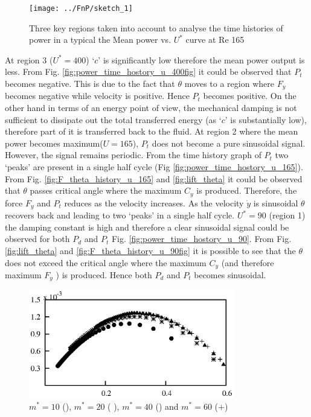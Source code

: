\begin{figure}[h!]
\centering
\texttt{[image: ../FnP/sketch\_1]}
\caption{ Three key regions taken into account to analyse the time histories of power in a typical the Mean power vs. $U^*$ curve at Re 165 }
\label{fig:regions_1}
\end{figure}









At region 3 ($U^*= 400$) `$c$' is significantly low therefore the mean power output is less. From Fig. \ref{fig:power_time_hostory_u_400fig} it could be observed that $P_t$ becomes negative. This is due to the fact that $\theta$ moves to a region where $F_y$ becomes negative while velocity is positive. Hence $P_t$ becomes positive. On the other hand in terms of an energy point  of view, the mechanical damping is not sufficient to dissipate out the total transferred energy (as `$c$' is substantially low), therefore  part of it  is transferred back to the fluid. At region 2 where the  mean power becomes maximum($U=165$), $P_t$ does not become a pure sinusoidal signal. However, the  signal remains periodic. From the time history graph of $P_t$ two `peaks' are present in a single half cycle (Fig \ref{fig:power_time_hostory_u_165}). From  Fig. \ref{fig:F_theta_history_u_165} and \ref{fig:lift_theta} it could be observed that $\theta$ passes critical angle where the maximum $C_y$ is produced. Therefore, the force $F_y$ and $P_t$ reduces as the velocity increases. As the velocity $\dot{y}$ is sinusoidal $\theta$ recovers back and leading to two `peaks'  in a single half cycle.  $U^*=90$ (region 1) the damping constant is high and therefore a clear sinusoidal signal could be observed for both $P_d$ and $P_t$ Fig. \ref{fig:power_time_hostory_u_90}. From Fig. \ref{fig:lift_theta} and  \ref{fig:F_theta_history_u_90fig}  it is possible to see that the $\theta$  does not exceed the critical angle where the maximum $C_y$ (and therefore maximum $F_y$ ) is produced. Hence both $P_d$ and $P_t$ becomes sinusoidal.
  
  
  \begin{figure}
\centering
\includegraphics[width=0.8\textwidth]{../FnP/gnuplot/mean_power_collapsed_mstar}
\caption{$m^*=10$ (), $m^*=20$ ( ),  $m^*=40$ () and   $m^* = 60$ ($+$)}
\label{fig:mean_power_collapsed_mstar}
\end{figure}

